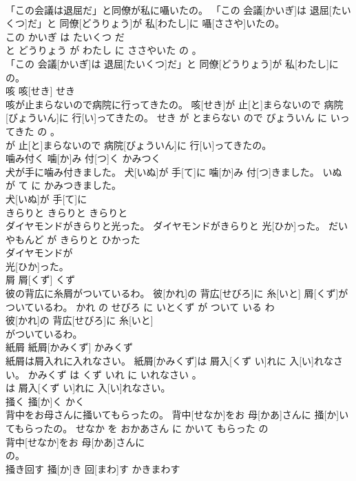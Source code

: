 \documentclass[8pt]{extreport}
\begin{document}
\begin{CJK}{UTF8}{min}
\\	「この会議は退屈だ」と同僚が私に囁いたの。	「この 会議[かいぎ]は 退屈[たいくつ]だ」と 同僚[どうりょう]が 私[わたし]に 囁[ささや]いたの。	
\\	この かいぎ は たいくつ だ 
\\	と どうりょう が わたし に ささやいた の 。	
\\	「この 会議[かいぎ]は 退屈[たいくつ]だ」と 同僚[どうりょう]が 私[わたし]に
\\	の。			
\\	咳	咳[せき]	せき	
\\	咳が止まらないので病院に行ってきたの。	咳[せき]が 止[と]まらないので 病院[びょういん]に 行[い]ってきたの。	せき が とまらない ので びょういん に いってきた の 。	
\\	が 止[と]まらないので 病院[びょういん]に 行[い]ってきたの。			
\\	噛み付く	噛[か]み 付[つ]く	かみつく	
\\	犬が手に噛み付きました。	犬[いぬ]が 手[て]に 噛[か]み 付[つ]きました。	いぬ が て に かみつきました。	
\\	犬[いぬ]が 手[て]に
\\	きらりと	きらりと	きらりと	
\\	ダイヤモンドがきらりと光った。	ダイヤモンドがきらりと 光[ひか]った。	だいやもんど が きらりと ひかった	
\\	ダイヤモンドが
\\	光[ひか]った。			
\\	屑	屑[くず]	くず	
\\	彼の背広に糸屑がついているわ。	彼[かれ]の 背広[せびろ]に 糸[いと] 屑[くず]がついているわ。	かれ の せびろ に いとくず が ついて いる わ	
\\	彼[かれ]の 背広[せびろ]に 糸[いと]
\\	がついているわ。			
\\	紙屑	紙屑[かみくず]	かみくず	
\\	紙屑は屑入れに入れなさい。	紙屑[かみくず]は 屑入[くず い]れに 入[い]れなさい。	かみくず は くず いれ に いれなさい 。	
\\	は 屑入[くず い]れに 入[い]れなさい。			
\\	掻く	掻[か]く	かく	
\\	背中をお母さんに掻いてもらったの。	背中[せなか]をお 母[かあ]さんに 掻[か]いてもらったの。	せなか を おかあさん に かいて もらった の	
\\	背中[せなか]をお 母[かあ]さんに
\\	の。			
\\	掻き回す	掻[か]き 回[まわ]す	かきまわす	

\end{CJK}
\end{document}
